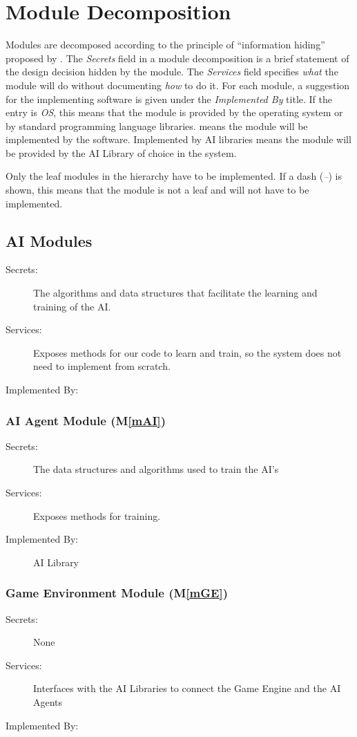 \documentclass[12pt, titlepage]{article}
\newcommand{\mref}[1]{M\ref{#1}}
\begin{document}
\section{Module Decomposition} \label{SecMD}

Modules are decomposed according to the principle of ``information hiding''
proposed by \citet{ParnasEtAl1984}. The \emph{Secrets} field in a module
decomposition is a brief statement of the design decision hidden by the
module. The \emph{Services} field specifies \emph{what} the module will do
without documenting \emph{how} to do it. For each module, a suggestion for the
implementing software is given under the \emph{Implemented By} title. If the
entry is \emph{OS}, this means that the module is provided by the operating
system or by standard programming language libraries.  \emph{\progname{}} means the
module will be implemented by the \progname{} software.  Implemented by AI libraries means the module will be provided by the AI Library of choice in the system.

Only the leaf modules in the hierarchy have to be implemented. If a dash
(\emph{--}) is shown, this means that the module is not a leaf and will not have
to be implemented.

\subsection{AI Modules}
\begin{description}
\item[Secrets:] The algorithms and data structures that facilitate the learning and training of the AI.
\item[Services:] Exposes methods for our code to learn and train, so the system does not need to implement from scratch.
\item[Implemented By:] \progname{} 
\end{description}

\subsubsection{AI Agent Module (\mref{mAI})}
\begin{description}
\item[Secrets:] The data structures and algorithms used to train the AI's
\item[Services:] Exposes methods for training.
\item[Implemented By:] AI Library
\end{description}
\subsubsection{Game Environment Module (\mref{mGE})}
\begin{description}
\item[Secrets:] None
\item[Services:] Interfaces with the AI Libraries to connect the Game Engine and the AI Agents
\item[Implemented By:] \progname{}
\end{description}
\end{document}
